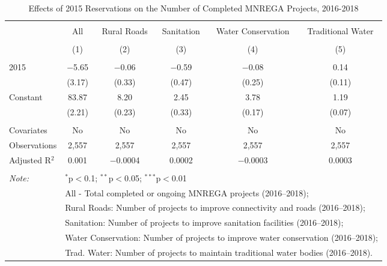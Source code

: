 
\begin{table}[!htbp] \centering 
  \caption{Effects of 2015 Reservations on the Number of Completed MNREGA Projects, 2016-2018} 
  \label{main_mnrega_15} 
\scriptsize 
\begin{tabular}{@{\extracolsep{0pt}}lccccc} 
\\[-1.8ex]\hline 
\hline \\[-1.8ex] 
 & All & Rural Roads & Sanitation & Water Conservation & Traditional Water \\ 
\\[-1.8ex] & (1) & (2) & (3) & (4) & (5)\\ 
\hline \\[-1.8ex] 
 2015 & $-$5.65 & $-$0.06 & $-$0.59 & $-$0.08 & 0.14 \\ 
  & (3.17) & (0.33) & (0.47) & (0.25) & (0.11) \\ 
  Constant & 83.87 & 8.20 & 2.45 & 3.78 & 1.19 \\ 
  & (2.21) & (0.23) & (0.33) & (0.17) & (0.07) \\ 
 \hline \\[-1.8ex] 
Covariates & No & No & No & No & No \\ 
Observations & 2,557 & 2,557 & 2,557 & 2,557 & 2,557 \\ 
Adjusted R$^{2}$ & 0.001 & $-$0.0004 & 0.0002 & $-$0.0003 & 0.0003 \\ 
\hline 
\hline \\[-1.8ex] 
\textit{Note:}  & \multicolumn{5}{l}{$^{*}$p$<$0.1; $^{**}$p$<$0.05; $^{***}$p$<$0.01} \\ 
 & \multicolumn{5}{l}{All - Total completed or ongoing MNREGA projects (2016--2018);} \\ 
 & \multicolumn{5}{l}{Rural Roads: Number of projects to improve connectivity and roads (2016--2018);} \\ 
 & \multicolumn{5}{l}{Sanitation:  Number of projects to improve sanitation facilities  (2016--2018);} \\ 
 & \multicolumn{5}{l}{Water Conservation: Number of projects to improve water conservation (2016--2018);} \\ 
 & \multicolumn{5}{l}{Trad. Water: Number of projects to maintain traditional water bodies (2016--2018).} \\ 
\end{tabular} 
\end{table} 

